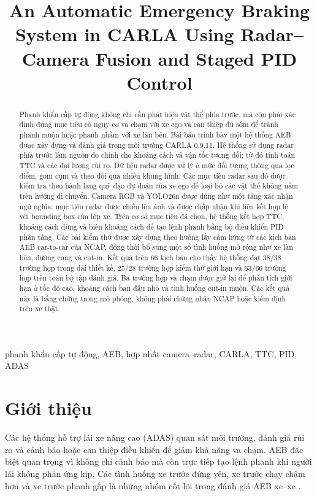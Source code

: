 \documentclass[conference]{IEEEtran}
\title{An Automatic Emergency Braking System in CARLA Using Radar--Camera Fusion and Staged PID Control}
\author{
\IEEEauthorblockN{Mai Việt Hoàng và Phạm Đức An}
\IEEEauthorblockA{
\textit{Đại học Bách khoa Hà Nội}\\
Hà Nội, Việt Nam\\
hoangmai04222@gmail.com
}
}
\begin{document}
\maketitle
\begin{abstract}
Phanh khẩn cấp tự động không chỉ cần phát hiện vật thể phía trước, mà còn phải xác định đúng mục tiêu có nguy cơ va chạm với xe ego và can thiệp đủ sớm để tránh phanh muộn hoặc phanh nhầm với xe làn bên. Bài báo trình bày một hệ thống AEB được xây dựng và đánh giá trong môi trường CARLA 0.9.11. Hệ thống sử dụng radar phía trước làm nguồn đo chính cho khoảng cách và vận tốc tương đối; từ đó tính toán TTC và các đại lượng rủi ro. Dữ liệu radar được xử lý ở mức đối tượng thông qua lọc điểm, gom cụm và theo dõi qua nhiều khung hình. Các mục tiêu radar sau đó được kiểm tra theo hành lang quỹ đạo dự đoán của xe ego để loại bỏ các vật thể không nằm trên hướng di chuyển. Camera RGB và YOLO26n được dùng như một tầng xác nhận ngữ nghĩa: mục tiêu radar được chiếu lên ảnh và được chấp nhận khi liên kết hợp lệ với bounding box của lớp xe. Trên cơ sở mục tiêu đã chọn, hệ thống kết hợp TTC, khoảng cách dừng và biên khoảng cách để tạo lệnh phanh bằng bộ điều khiển PID phân tầng. Các bài kiểm thử được xây dựng theo hướng lấy cảm hứng từ các kịch bản AEB car-to-car của NCAP, đồng thời bổ sung một số tình huống mở rộng như xe làn bên, đường cong và cut-in. Kết quả trên 66 kịch bản cho thấy hệ thống đạt 38/38 trường hợp trong dải thiết kế, 25/28 trường hợp kiểm thử giới hạn và 63/66 trường hợp trên toàn bộ tập đánh giá. Ba trường hợp va chạm được giữ lại để phân tích giới hạn ở tốc độ cao, khoảng cách ban đầu nhỏ và tình huống cut-in muộn. Các kết quả này là bằng chứng trong mô phỏng, không phải chứng nhận NCAP hoặc kiểm định trên xe thật.
\end{abstract}
\begin{IEEEkeywords}
phanh khẩn cấp tự động, AEB, hợp nhất camera--radar, CARLA, TTC, PID, ADAS
\end{IEEEkeywords}

\section{Giới thiệu}
Các hệ thống hỗ trợ lái xe nâng cao (ADAS) quan sát môi trường, đánh giá rủi ro và cảnh báo hoặc can thiệp điều khiển để giảm khả năng va chạm. AEB đặc biệt quan trọng vì không chỉ cảnh báo mà còn trực tiếp tạo lệnh phanh khi người lái không phản ứng kịp. Các tình huống xe trước đứng yên, xe trước chạy chậm hơn và xe trước phanh gấp là những nhóm cốt lõi trong đánh giá AEB xe--xe \cite{euroncap_aeb,iso15623}.
\end{document}
